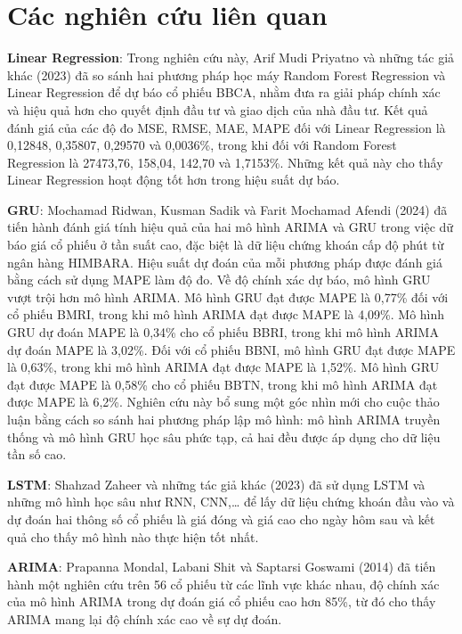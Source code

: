 \section{Các nghiên cứu liên quan}
\textbf{Linear Regression}: Trong nghiên cứu này, Arif Mudi Priyatno và những tác giả khác \cite{b1} (2023) đã so sánh hai phương pháp học máy Random Forest Regression và Linear Regression để dự báo cổ phiếu BBCA, nhằm đưa ra giải pháp chính xác và hiệu quả hơn cho quyết định đầu tư và giao dịch của nhà đầu tư. Kết quả đánh giá của các độ đo MSE, RMSE, MAE, MAPE đối với Linear Regression là 0,12848, 0,35807, 0,29570 và 0,0036\%, trong khi đối với Random Forest Regression là 27473,76, 158,04, 142,70 và 1,7153\%. Những kết quả này cho thấy Linear Regression hoạt động tốt hơn trong hiệu suất dự báo.
\par
\textbf{GRU}: Mochamad Ridwan, Kusman Sadik và Farit Mochamad Afendi \cite{b2} (2024) đã tiến hành đánh giá tính hiệu quả của hai mô hình ARIMA và GRU trong việc dữ báo giá cổ phiếu ở tần suất cao, đặc biệt là dữ liệu chứng khoán cấp độ phút từ ngân hàng HIMBARA. Hiệu suất dự đoán của mỗi phương pháp được đánh giá bằng cách sử dụng MAPE làm độ đo. Về độ chính xác dự báo, mô hình GRU vượt trội hơn mô hình ARIMA. Mô hình GRU đạt được MAPE là 0,77\% đối với cổ phiếu BMRI, trong khi mô hình ARIMA đạt được MAPE là 4,09\%. Mô hình GRU dự đoán MAPE là 0,34\% cho cổ phiếu BBRI, trong khi mô hình ARIMA dự đoán MAPE là 3,02\%. Đối với cổ phiếu BBNI, mô hình GRU đạt được MAPE là 0,63\%, trong khi mô hình ARIMA đạt được MAPE là 1,52\%. Mô hình GRU đạt được MAPE là 0,58\% cho cổ phiếu BBTN, trong khi mô hình ARIMA đạt được MAPE là 6,2\%. Nghiên cứu này bổ sung một góc nhìn mới cho cuộc thảo luận bằng cách so sánh hai phương pháp lập mô hình: mô hình ARIMA truyền thống và mô hình GRU học sâu phức tạp, cả hai đều được áp dụng cho dữ liệu tần số cao.
\par
\textbf{LSTM}: Shahzad Zaheer và những tác giả khác \cite{b3} (2023) đã sử dụng LSTM và những mô hình học sâu như RNN, CNN,… để lấy dữ liệu chứng khoán đầu vào và dự đoán hai thông số cổ phiếu là giá đóng và giá cao cho ngày hôm sau và kết quả cho thấy mô hình nào thực hiện tốt nhất.
\par
\textbf{ARIMA}: Prapanna Mondal, Labani Shit và Saptarsi Goswami \cite{b4} (2014) đã tiến hành một nghiên cứu trên 56 cổ phiếu từ các lĩnh vực khác nhau, độ chính xác của mô hình ARIMA trong dự đoán giá cổ phiếu cao hơn 85\%, từ đó cho thấy ARIMA mang lại độ chính xác cao về sự dự đoán.
\par

